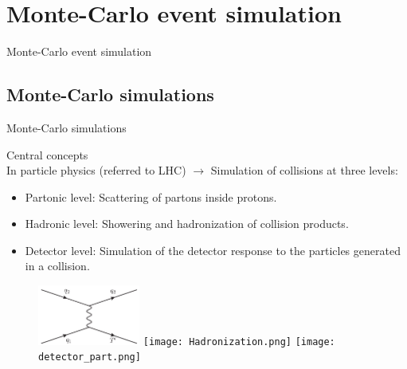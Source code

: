 \section[MC]{Monte-Carlo event simulation}
\setcounter{tocdepth}{2}

\begin{frame}
\begin{center}
Monte-Carlo event simulation
\end{center}
\end{frame}

\subsection{Monte-Carlo simulations}
\begin{frame}{Monte-Carlo simulations}
\vspace{-.2cm}
\begin{block}{Central concepts}
\scriptsize {}\\
In particle physics (referred to LHC) $\to$ Simulation of collisions at three levels:
\begin{itemize}
\item Partonic level: Scattering of partons inside protons.
\item Hadronic level: Showering and hadronization of collision products.
\item Detector level: Simulation of the detector response to the particles generated in a collision.
\end{itemize}
\end{block}

\begin{figure}[!Hhtbp]
  \begin{center}
    \includegraphics[width=0.3\textwidth]{../figs/Tchannel_T_single.jpg}
    \texttt{[image: Hadronization.png]}
    \texttt{[image: detector\_part.png]}
  \end{center}
\end{figure}

\end{frame}



